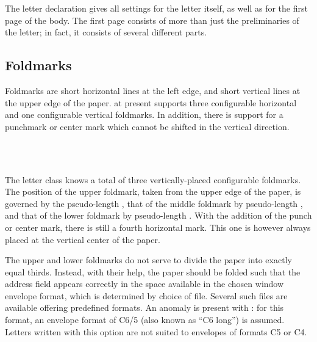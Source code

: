 The letter declaration gives all settings for the letter itself, as
well as for the first page of the body. The first page consists of
more than just the preliminaries of the letter; in fact, it consists
of several different parts.


\subsection{Foldmarks}
\label{sec:scrlttr2.foldmarks}
%

Foldmarks are short horizontal lines at the left edge,
and short vertical lines at the upper edge of the paper. \KOMAScript{}
at present supports three configurable horizontal and one configurable
vertical foldmarks. In addition, there is support for a punchmark or
center mark which cannot be shifted in the vertical direction.

\begin{Declaration}
  \\
  \\
\end{Declaration}
%
%
%
The letter class  knows a total of three
vertically-placed configurable foldmarks. The position of the upper
foldmark, taken from the upper edge of the paper, is governed by the
pseudo-length , that of the middle foldmark by
pseudo-length
, and that
of the lower foldmark by pseudo-length . With
the addition of the punch or 
center%
mark, there is still a fourth horizontal mark. This one is however
always placed at the vertical center of the paper.

The upper and lower foldmarks do not serve to divide the paper into
exactly equal thirds. Instead, with their help, the paper should be
folded such that the address field appears correctly in the space
available in the chosen window envelope format, which is determined by
choice of  file. Several such files are available offering
predefined formats. An anomaly is present with : for
this format, an envelope format of C6/5 (also known as ``C6 long'') is
assumed. Letters written with this option are not suited to envelopes
of formats C5 or C4.

